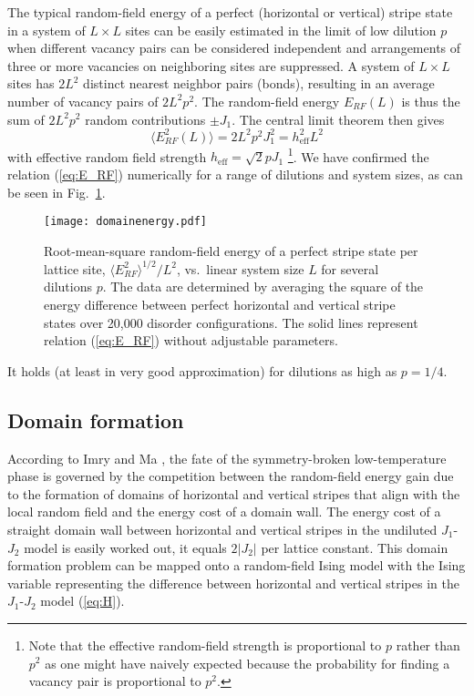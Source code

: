\documentclass[twocolumn,showpacs,superscriptaddress,aps,prb]{revtex4-2}
\begin{document}
The typical random-field energy of a perfect (horizontal or vertical) stripe state
in a system of $L\times L$ sites can be easily estimated in the
limit of low dilution $p$ when different vacancy pairs can be considered independent and
arrangements of three or more vacancies on neighboring sites are suppressed.
A system of $L\times L$ sites has $2L^2$ distinct nearest neighbor pairs (bonds), resulting
in an average number of vacancy pairs of $2 L^2 p^2$. The random-field energy $E_{RF}(L)$
is thus the sum of $2 L^2 p^2$ random contributions $\pm J_1$. The central limit theorem
then gives
\begin{equation}
\langle E_{RF}^2(L) \rangle = 2 L^2 p^2 J_1^2 = h_\mathrm{eff}^2 L^2
\label{eq:E_RF}
\end{equation}
with effective random field strength $h_\mathrm{eff} = \sqrt{2} p J_1$
\footnote{Note that the effective random-field strength is proportional to $p$
rather than $p^2$ as one might have naively expected because the probability
for finding a vacancy pair is proportional to $p^2$.}.
We have confirmed the relation (\ref{eq:E_RF}) numerically for a range of dilutions
and system sizes, as can be seen in Fig.\ \ref{fig:E_RF}.
\begin{figure}
\texttt{[image: domainenergy.pdf]}
\caption{Root-mean-square random-field energy of a perfect stripe state per lattice site, $\langle E_{RF}^2\rangle^{1/2}/L^2$,
vs.\ linear system size $L$ for several dilutions $p$. The data are determined by averaging the square of the energy difference
between perfect horizontal and vertical stripe states over 20,000 disorder configurations.
The solid lines represent relation (\ref{eq:E_RF}) without adjustable parameters. }
\label{fig:E_RF}
\end{figure}
It holds (at least in very good approximation) for dilutions as high as $p=1/4$.


\subsection{Domain formation}
\label{subsec:domain}

According to Imry and Ma \cite{ImryMa75}, the fate of the symmetry-broken low-temperature phase
is governed by the competition between the random-field energy gain due to the formation
of domains of horizontal and vertical stripes that align with the local random field
and the energy cost of a domain wall. The energy cost of a straight domain wall between
horizontal and vertical stripes in the undiluted $J_1$-$J_2$ model is easily worked out,
it equals $2 |J_2|$ per
lattice constant. This domain formation problem can be mapped onto a random-field Ising
model with the Ising variable representing the difference between horizontal and vertical
stripes in the $J_1$-$J_2$ model (\ref{eq:H}).
\end{document}
